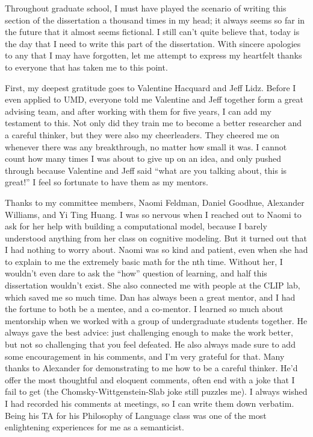 Throughout graduate school, I must have played the scenario of writing this section of the dissertation a thousand times in my head; it always seems so far in the future that it almost seems fictional. I still can’t quite believe that, today is the day that I need to write this part of the dissertation. With sincere apologies to any that I may have forgotten, let me attempt to express my heartfelt thanks to everyone that has taken me to this point.
 
First, my deepest gratitude goes to Valentine Hacquard and Jeff Lidz. Before I even applied to UMD, everyone told me Valentine and Jeff together form a great advising team, and after working with them for five years, I can add my testament to this. Not only did they train me to become a better researcher and a careful thinker, but they were also my cheerleaders. They cheered me on whenever there was any breakthrough, no matter how small it was. I cannot count how many times I was about to give up on an idea, and only pushed through because Valentine and Jeff said “what are you talking about, this is great!” I feel so fortunate to have them as my mentors.
 
Thanks to my committee members, Naomi Feldman, Daniel Goodhue, Alexander Williams, and Yi Ting Huang. I was so nervous when I reached out to Naomi to ask for her help with building a computational model, because I barely understood anything from her class on cognitive modeling. But it turned out that I had nothing to worry about. Naomi was so kind and patient, even when she had to explain to me the extremely basic math for the nth time. Without her, I wouldn’t even dare to ask the ``how” question of learning, and half this dissertation wouldn’t exist. She also connected me with people at the CLIP lab, which saved me so much time. Dan has always been a great mentor, and I had the fortune to both be a mentee, and a co-mentor. I learned so much about mentorship when we worked with a group of undergraduate students together. He always gave the best advice: just challenging enough to make the work better, but not so challenging that you feel defeated. He also always made sure to add some encouragement in his comments, and I’m very grateful for that. Many thanks to Alexander for demonstrating to me how to be a careful thinker. He’d offer the most thoughtful and eloquent comments, often end with a joke that I fail to get (the Chomsky-Wittgenstein-Slab joke still puzzles me). I always wished I had recorded his comments at meetings, so I can write them down verbatim. Being his TA for his Philosophy of Language class was one of the most enlightening experiences for me as a semanticist.
 
